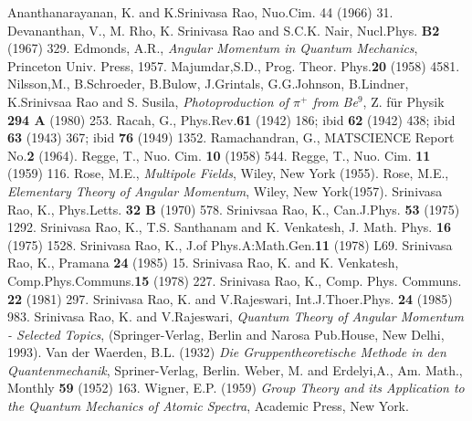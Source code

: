\begin{thebibliography}{99}
 Ananthanarayanan, K. and K.Srinivasa Rao, Nuo.Cim. 44 (1966) 31.
 Devananthan, V., M. Rho, K. Srinivasa Rao and S.C.K. Nair, Nucl.Phys. {\bf B2} (1967) 329.
 Edmonds, A.R., \textit{Angular Momentum in Quantum Mechanics}, Princeton Univ. Press, 1957.
 Majumdar,S.D., Prog. Theor. Phys.{\bf 20} (1958) 4581.
 Nilsson,M., B.Schroeder, B.Bulow, J.Grintals, G.G.Johnson, B.Lindner, K.Srinivsaa Rao and S. Susila, \textit{Photoproduction of $\pi^+$ from Be$^9$}, Z. f\"{u}r Physik {\bf 294 A} (1980) 253.
 Racah, G., Phys.Rev.{\bf 61} (1942) 186; ibid {\bf 62} (1942) 438; ibid {\bf 63} (1943) 367; ibid {\bf 76} (1949) 1352.
 Ramachandran, G., MATSCIENCE Report No.{\bf 2} (1964).
 Regge, T., Nuo. Cim. {\bf 10} (1958) 544.
 Regge, T., Nuo. Cim. {\bf 11} (1959) 116.
 Rose, M.E., \textit{Multipole Fields}, Wiley, New York (1955).
 Rose, M.E., \textit{Elementary Theory of Angular Momentum}, Wiley, New York(1957).
 Srinivasa Rao, K., Phys.Letts. {\bf 32 B} (1970) 578.
 Srinivsaa Rao, K., Can.J.Phys. {\bf 53} (1975) 1292.
 Srinivasa Rao, K., T.S. Santhanam and K. Venkatesh, J. Math. Phys. {\bf 16} (1975) 1528.
 Srinivasa Rao, K., J.of Phys.A:Math.Gen.{\bf 11} (1978) L69.
 Srinivasa Rao, K., Pramana {\bf 24} (1985) 15.
 Srinivasa Rao, K. and K. Venkatesh, Comp.Phys.Communs.{\bf 15} (1978) 227.
 Srinivasa Rao, K., Comp. Phys. Communs. {\bf 22} (1981) 297.
 Srinivasa Rao, K. and V.Rajeswari, Int.J.Thoer.Phys. {\bf 24} (1985) 983.
 Srinivasa Rao, K. and V.Rajeswari, \textit{Quantum Theory of Angular Momentum - Selected Topics}, (Springer-Verlag, Berlin and Narosa Pub.House, New Delhi, 1993).
 Van der Waerden, B.L. (1932) \textit{Die Gruppentheoretische Methode in den Quantenmechanik}, Spriner-Verlag, Berlin.
 Weber, M. and Erdelyi,A., Am. Math., Monthly {\bf 59} (1952) 163.
 Wigner, E.P. (1959) \textit{Group Theory and its Application to the Quantum Mechanics of Atomic Spectra}, Academic Press, New York.
\end{thebibliography}
